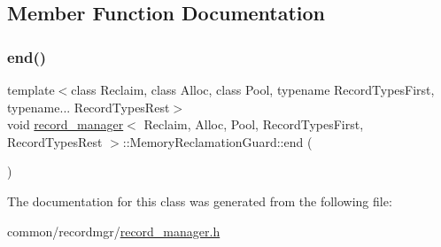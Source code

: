 \subsection{Member Function Documentation}
\mbox{\label{classrecord__manager_1_1MemoryReclamationGuard_ac3f1295823181aff94971f7b214c78ea}} 
\subsubsection{\texorpdfstring{end()}{end()}}
{\footnotesize\ttfamily template$<$class Reclaim, class Alloc, class Pool, typename Record\+Types\+First, typename... Record\+Types\+Rest$>$ \\
void \hyperlink{classrecord__manager}{record\+\_\+manager}$<$ Reclaim, Alloc, Pool, Record\+Types\+First, Record\+Types\+Rest $>$\+::Memory\+Reclamation\+Guard\+::end (\begin{DoxyParamCaption}{ }\end{DoxyParamCaption})\hspace{0.3cm}{\ttfamily [inline]}}



The documentation for this class was generated from the following file\+:\begin{DoxyCompactItemize}
\item 
common/recordmgr/\hyperlink{record__manager_8h}{record\+\_\+manager.\+h}\end{DoxyCompactItemize}
